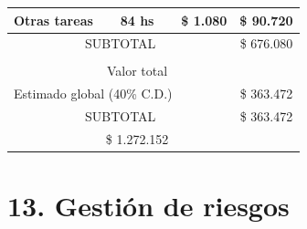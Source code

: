 \documentclass[
11pt, %
codirector, %
]{charter}
\begin{document}
\begin{table}[htpb]
\begin{tabularx}{\linewidth}{@{}|X|c|r|r|@{}}
 Otras tareas &
  \multicolumn{1}{c|}{84 hs} &
  \multicolumn{1}{c|}{\$ 1.080} &
  \multicolumn{1}{c|}{\$ 90.720} \\ \hline
  
\multicolumn{3}{|c|}{SUBTOTAL} &
  \multicolumn{1}{c|}{\$ 676.080} \\ \hline  
  
\rowcolor[HTML]{C0C0C0} 
\multicolumn{4}{|c|}{\cellcolor[HTML]{C0C0C0}COSTOS INDIRECTOS} \\ \hline

\rowcolor[HTML]{C0C0C0} 
\multicolumn{3}{|l|}{Descripción} &
  \multicolumn{1}{c|}{\cellcolor[HTML]{C0C0C0}Valor total} \\ \hline
\multicolumn{3}{|l|}{Estimado global (40\% C.D.)} & \multicolumn{1}{c|}{\$ 363.472 } \\ \hline


\multicolumn{3}{|c|}{SUBTOTAL} &  
  \multicolumn{1}{c|}{\$ 363.472 } \\ \hline
\rowcolor[HTML]{C0C0C0}
\multicolumn{3}{|c|}{TOTAL} &
  \multicolumn{1}{c|}{\$ 1.272.152 } \\ \hline
\end{tabularx}%
\end{table}


\section{13. Gestión de riesgos}
\label{sec:riesgos}
\end{document}
